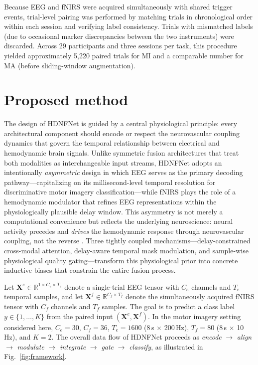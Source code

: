 \documentclass[preprint,12pt,authoryear]{elsarticle}
\begin{document}
Because EEG and fNIRS were acquired simultaneously with shared trigger events, trial-level pairing was performed by matching trials in chronological order within each session and verifying label consistency. Trials with mismatched labels (due to occasional marker discrepancies between the two instruments) were discarded. Across 29 participants and three sessions per task, this procedure yielded approximately 5,220 paired trials for MI and a comparable number for MA (before sliding-window augmentation).


\section{Proposed method}
\label{sec:method}

The design of HDNFNet is guided by a central physiological principle: every architectural component should encode or respect the neurovascular coupling dynamics that govern the temporal relationship between electrical and hemodynamic brain signals. Unlike symmetric fusion architectures that treat both modalities as interchangeable input streams, HDNFNet adopts an intentionally \textit{asymmetric} design in which EEG serves as the primary decoding pathway---capitalizing on its millisecond-level temporal resolution for discriminative motor imagery classification---while fNIRS plays the role of a hemodynamic modulator that refines EEG representations within the physiologically plausible delay window. This asymmetry is not merely a computational convenience but reflects the underlying neuroscience: neural activity precedes and \textit{drives} the hemodynamic response through neurovascular coupling, not the reverse \citep{buxton1998dynamics}. Three tightly coupled mechanisms---delay-constrained cross-modal attention, delay-aware temporal mask modulation, and sample-wise physiological quality gating---transform this physiological prior into concrete inductive biases that constrain the entire fusion process.

Let $\mathbf{X}^{e} \in \mathbb{R}^{1 \times C_e \times T_e}$ denote a single-trial EEG tensor with $C_e$ channels and $T_e$ temporal samples, and let $\mathbf{X}^{f} \in \mathbb{R}^{C_f \times T_f}$ denote the simultaneously acquired fNIRS tensor with $C_f$ channels and $T_f$ samples. The goal is to predict a class label $y \in \{1, \ldots, K\}$ from the paired input $(\mathbf{X}^{e}, \mathbf{X}^{f})$. In the motor imagery setting considered here, $C_e = 30$, $C_f = 36$, $T_e = 1600$ (8\,s $\times$ 200\,Hz), $T_f = 80$ (8\,s $\times$ 10\,Hz), and $K = 2$. The overall data flow of HDNFNet proceeds as \textit{encode} $\to$ \textit{align} $\to$ \textit{modulate} $\to$ \textit{integrate} $\to$ \textit{gate} $\to$ \textit{classify}, as illustrated in Fig.~\ref{fig:framework}.
\end{document}
